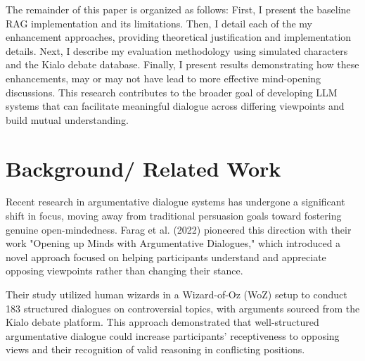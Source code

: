 \documentclass[11pt]{article}
\begin{document}
The remainder of this paper is organized as follows: First, I present the baseline RAG implementation and its limitations. Then, I detail each of the my enhancement approaches, providing theoretical justification and implementation details. Next, I describe my evaluation methodology using simulated characters and the Kialo debate database. Finally, I present results demonstrating how these enhancements, may or may not have lead to more effective mind-opening discussions. This research contributes to the broader goal of developing LLM systems that can facilitate meaningful dialogue across differing viewpoints and build mutual understanding.


\section{Background/ Related Work}
Recent research in argumentative dialogue systems has undergone a significant shift in focus, moving away from traditional persuasion goals toward fostering genuine open-mindedness. Farag et al. (2022) pioneered this direction with their work "Opening up Minds with Argumentative Dialogues," which introduced a novel approach focused on helping participants understand and appreciate opposing viewpoints rather than changing their stance.

Their study utilized human wizards in a Wizard-of-Oz (WoZ) setup to conduct 183 structured dialogues on controversial topics, with arguments sourced from the Kialo debate platform. This approach demonstrated that well-structured argumentative dialogue could increase participants' receptiveness to opposing views and their recognition of valid reasoning in conflicting positions.
\end{document}
